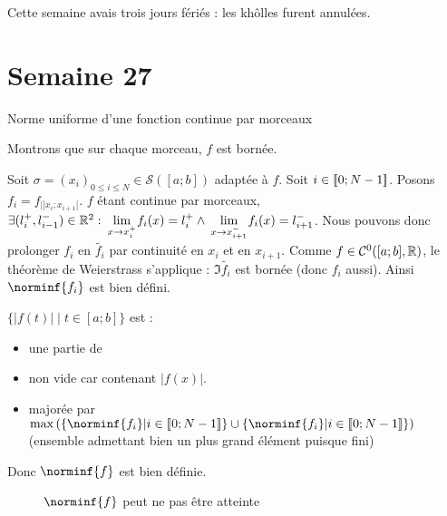 \documentclass{article}
\renewenvironment{question_kholle}[2][ ]
{
	\subsection{\texorpdfstring{#2}{}}
	\notblank{#1}
	{
		\noindent #1
		\bigbreak
	}
	{}
	\begin{proof}
}
{
	\end{proof}
}
\begin{document}
	Cette semaine avais trois jours fériés : les khôlles furent annulées.
\pagebreak\section{Semaine 27}
	
	\begin{question_kholle}
		{Norme uniforme d'une fonction continue par morceaux}
		
		Montrons que sur chaque morceau, $f$ est bornée.
		
		Soit $\sigma = (x_i)_{0 \leqslant i \leqslant N} \in \mathcal{S}([a;b])$ adaptée à $f$.
		Soit $i \in [\![ 0; N-1 ]\!]$. Posons $f_i = f_{|]x_i;x_{i+1}[}$.
		$f$ étant continue par morceaux, $\exists (l_i^+, l_{i-1}^-) \in \mathbb R^2 : \lim\limits_{\;x \to x_i^+\;}\!\! f_i(x) = l_i^+ \wedge \lim\limits_{\;x \to x_{i+1}^-\;}\!\! f_i(x) = l_{i+1}^-$.
		Nous pouvons donc prolonger $f_i$ en $\tilde{f_i}$ par continuité en $x_i$ et en $x_{i+1}$.
		Comme $f \in \Cont{0}{[a;b]}{}$, le théorème de Weierstrass s'applique : $\Im \tilde{f_i}$ est bornée (donc $f_i$ aussi). Ainsi $\norminf{f_i}$ est bien défini.
		
		\noindent $\{ |f(t)| \;|\; t \in [a;b] \}$ est : \begin{itemize}
			\item une partie de \R
			\item non vide car contenant $|f(x)|$.
			\item majorée par $\max \left( \{\norminf{f_i} | i \in \lient 0; N-1 \rient\} \cup \{\norminf{f_i} | i \in \lient 0; N-1 \rient\} \right)$ (ensemble admettant bien un plus grand élément puisque fini)
		\end{itemize}
		Donc $\norminf{f}$ est bien définie.
		\begin{figure}[H]
			\centering
			\caption{$\norminf{f}$ peut ne pas être atteinte}
		\end{figure}
	\end{question_kholle}
	
\end{document}
